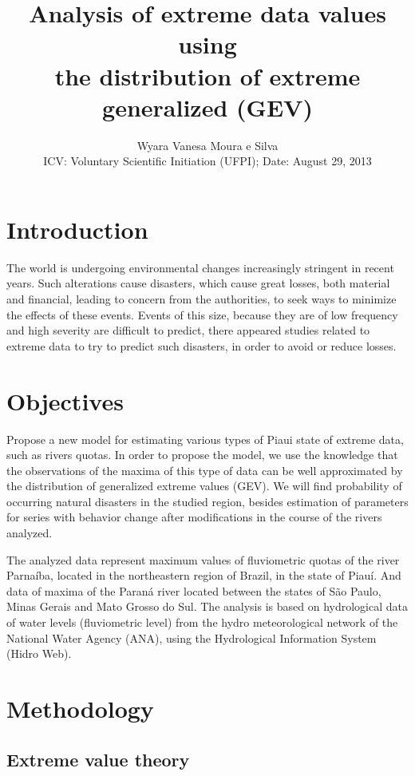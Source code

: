 \documentclass{asaproc}
\title{Analysis of extreme data values using \\ the distribution of extreme generalized (GEV)}
\author{Wyara Vanesa Moura e Silva\\
ICV: Voluntary Scientific Initiation (UFPI); Date: August 29, 2013\\}
\begin{document}
\maketitle

\section{Introduction}

The world is undergoing environmental changes increasingly stringent in recent years. Such alterations cause disasters, which cause great losses, both material and financial, leading to concern from the authorities, to seek ways to minimize the effects of these events. Events of this size, because they are of low frequency and high severity are difficult to predict, there appeared studies related to extreme data to try to predict such disasters, in order to avoid or reduce losses.

\section{Objectives}

Propose a new model for estimating various types of Piaui state of extreme data, such as rivers quotas. In order to propose the model, we use the knowledge that the observations of the maxima of this type of data can be well approximated by the distribution of generalized extreme values (GEV). We will find probability of occurring natural disasters in the studied region, besides estimation of parameters for series with behavior change after modifications in the course of the rivers analyzed.

The analyzed data represent maximum values of fluviometric quotas of the river Parna\'iba, located in the northeastern region of Brazil, in the state of Piau\'i. And data of maxima of the Paran\'a river located between the states of São Paulo, Minas Gerais and Mato Grosso do Sul. The analysis is based on hydrological data of water levels (fluviometric level) from the hydro meteorological network of the National Water Agency (ANA), using the Hydrological Information System (Hidro Web).

\section{Methodology}

\subsection{Extreme value theory}
\end{document}
